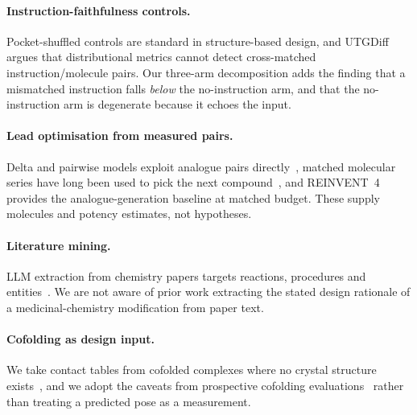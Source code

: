 \paragraph{Instruction-faithfulness controls.} Pocket-shuffled controls are standard in
structure-based design, and UTGDiff~\citep{utgdiff2024} argues that distributional metrics cannot
detect cross-matched instruction/molecule pairs. Our three-arm decomposition adds the finding that a
mismatched instruction falls \emph{below} the no-instruction arm, and that the no-instruction arm is
degenerate because it echoes the input.

\paragraph{Lead optimisation from measured pairs.} Delta and pairwise models exploit analogue pairs
directly~\citep{fralish2023deepdelta,feng2024actfound}, matched molecular series have long been used
to pick the next compound~\citep{wawer2014whatnext}, and REINVENT~4~\citep{loeffler2024reinvent4}
provides the analogue-generation baseline at matched budget. These supply molecules and potency
estimates, not hypotheses.

\paragraph{Literature mining.} LLM extraction from chemistry papers targets reactions, procedures
and entities~\citep{chemminer2024,materials2025ie}. We are not aware of prior work extracting the
stated design rationale of a medicinal-chemistry modification from paper text.

\paragraph{Cofolding as design input.} We take contact tables from cofolded complexes where no
crystal structure exists~\citep{wohlwend2024boltz1,passaro2025boltz2,abramson2024af3,chai2024chai1},
and we adopt the caveats from prospective cofolding
evaluations~\citep{cofold_prospective_2025} rather than treating a predicted pose as a measurement.
